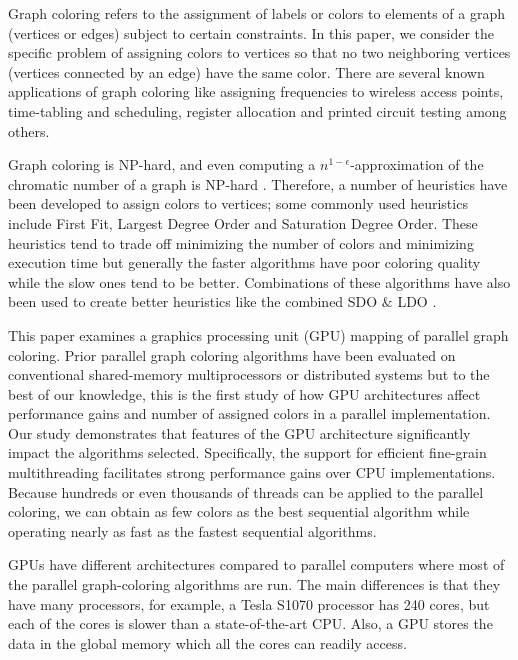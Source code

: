 \documentclass[preprint]{sigplanconf}
\begin{document}
Graph coloring refers to the assignment of labels or colors to elements of a graph (vertices or edges) subject to certain constraints. In this paper, we consider the specific problem of assigning colors to vertices so that no two neighboring vertices (vertices connected by an edge) have the same color. There are several known applications of graph coloring like assigning frequencies to wireless access points, time-tabling and scheduling, register allocation and printed circuit testing among others.

Graph coloring is NP-hard, and even computing a $n^{1-\epsilon}$-approximation of the chromatic number of a graph is NP-hard \cite{zuckerman07}. Therefore, a number of heuristics have been developed to assign colors to vertices; some commonly used heuristics include First Fit, Largest Degree Order and Saturation Degree Order\cite{al2006new}.  These heuristics tend to trade off minimizing the number of colors and minimizing execution time but generally the faster algorithms have poor coloring quality while the slow ones tend to be better. Combinations of these algorithms have also been used to create better heuristics like the combined SDO $\&$ LDO \cite{al2006new}.

This paper examines a graphics processing unit (GPU) mapping of parallel graph coloring.  Prior parallel graph coloring algorithms have been evaluated on conventional shared-memory multiprocessors \cite{gebremedhin2000scalable} or distributed systems \cite{bozdag2008a} but to the best of our knowledge, this is the first study of how GPU architectures affect performance gains and number of assigned colors in a parallel implementation.  Our study demonstrates that features of the GPU architecture significantly impact the algorithms selected. Specifically, the support for efficient fine-grain multithreading facilitates strong performance gains over CPU implementations. Because hundreds or even thousands of threads can be applied to the parallel coloring, we can obtain as few colors as the best sequential algorithm while operating nearly as fast as the fastest sequential algorithms. 

GPUs have different architectures compared to parallel computers where most of the parallel graph-coloring algorithms are run. The main differences is that they have many processors, for example, a Tesla S1070 processor has 240 cores, but each of the cores is slower than a state-of-the-art CPU. Also, a GPU stores the data in the global memory which all the cores can readily access.
\end{document}
